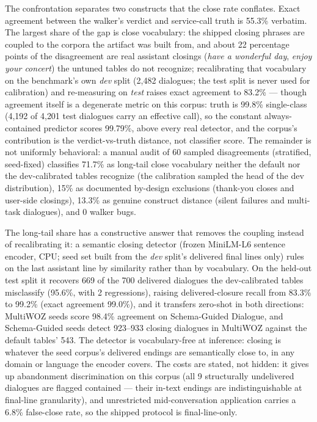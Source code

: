 The confrontation separates two constructs that the close rate conflates.
Exact agreement between the walker's verdict and service-call truth is 55.3\% verbatim.
The largest share of the gap is close vocabulary: the shipped closing phrases are coupled to
the corpora the artifact was built from, and about 22 percentage points of the disagreement
are real assistant closings (\emph{have a wonderful day}, \emph{enjoy your concert}) the
untuned tables do not recognize; recalibrating that vocabulary on the benchmark's own
\emph{dev} split (2{,}482 dialogues; the test split is never used for calibration) and
re-measuring on \emph{test} raises exact agreement to 83.2\% --- though agreement itself
is a degenerate metric on this corpus: truth is 99.8\% single-class (4{,}192 of 4{,}201
test dialogues carry an effective call), so the constant always-contained predictor scores
99.79\%, above every real detector, and the corpus's contribution is the verdict-vs-truth
distance, not classifier score.
The remainder is not uniformly behavioral: a manual audit of 60 sampled disagreements
(stratified, seed-fixed) classifies 71.7\% as long-tail close vocabulary neither the default
nor the dev-calibrated tables recognize (the calibration sampled the head of the dev
distribution), 15\% as documented by-design exclusions (thank-you closes and user-side
closings), 13.3\% as genuine construct distance (silent failures and multi-task dialogues),
and 0 walker bugs.

The long-tail share has a constructive answer that removes the coupling instead of
recalibrating it: a semantic closing detector (frozen MiniLM-L6 sentence encoder, CPU;
seed set built from the \emph{dev} split's delivered final lines only) rules on the last
assistant line by similarity rather than by vocabulary.
On the held-out test split it recovers 669 of the 700 delivered dialogues the
dev-calibrated tables misclassify (95.6\%, with 2 regressions), raising delivered-closure
recall from 83.3\% to 99.2\% (exact agreement 99.0\%), and it transfers zero-shot in both
directions: MultiWOZ seeds score 98.4\% agreement on Schema-Guided Dialogue, and
Schema-Guided seeds detect 923--933 closing dialogues in MultiWOZ against the default
tables' 543.
The detector is vocabulary-free at inference: closing is whatever the seed corpus's
delivered endings are semantically close to, in any domain or language the encoder covers.
The costs are stated, not hidden: it gives up abandonment discrimination on this corpus
(all 9 structurally undelivered dialogues are flagged contained --- their in-text endings
are indistinguishable at final-line granularity), and unrestricted mid-conversation
application carries a 6.8\% false-close rate, so the shipped protocol is final-line-only.

